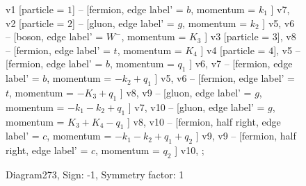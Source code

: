 \documentclass{revtex4}
\begin{document}
\begin{figure}[!htb]
\begin{center}
{    %
v1 [particle = \(1\)] -- [fermion, edge label' = \(b\), momentum = \(k_{1}\) ] v7, 
v2 [particle = \(2\)] -- [gluon, edge label' = \(g\), momentum = \(k_{2}\) ] v5, 
v6 -- [boson, edge label' = \(W^{-}\), momentum = \(K_{3}\) ] v3 [particle = \(3\)], 
v8 -- [fermion, edge label' = \(t\), momentum = \(K_{4}\) ] v4 [particle = \(4\)], 
v5 -- [fermion, edge label' = \(b\), momentum = \(q_{1}\) ] v6, 
v7 -- [fermion, edge label' = \(b\), momentum = \(-k_{2} + q_{1}\) ] v5, 
v6 -- [fermion, edge label' = \(t\), momentum = \(-K_{3} + q_{1}\) ] v8, 
v9 -- [gluon, edge label' = \(g\), momentum = \(-k_{1} - k_{2} + q_{1}\) ] v7, 
v10 -- [gluon, edge label' = \(g\), momentum = \(K_{3} + K_{4} - q_{1}\) ] v8, 
v10 -- [fermion, half right, edge label' = \(c\), momentum = \(-k_{1} - k_{2} + q_{1} + q_{2}\) ] v9, 
v9 -- [fermion, half right, edge label' = \(c\), momentum = \(q_{2}\) ] v10, 
};
\end{center}
\caption{Diagram273, Sign: -1, Symmetry factor: 1}
\end{figure}
\newpage
\end{document}
